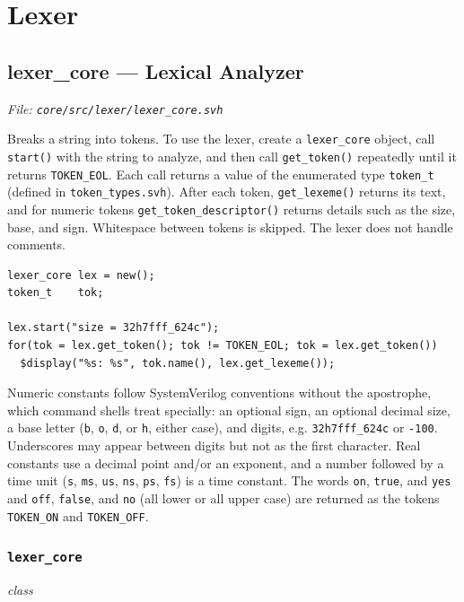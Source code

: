 \documentclass[11pt,letterpaper]{report}
\begin{document}
\chapter{Lexer}
\section{lexer\_core --- Lexical Analyzer}
\noindent\small\textit{File: \texttt{core/src/lexer/lexer\_core.svh}}\par

Breaks a string into tokens. To use the lexer, create a \texttt{lexer\_core} object, call \texttt{start()} with the string to analyze, and then call \texttt{get\_token()} repeatedly until it returns \texttt{TOKEN\_EOL}. Each call returns a value of the enumerated type \texttt{token\_t} (defined in \texttt{token\_types.svh}). After each token, \texttt{get\_lexeme()} returns its text, and for numeric tokens \texttt{get\_token\_descriptor()} returns details such as the size, base, and sign. Whitespace between tokens is skipped. The lexer does not handle comments.

\begin{verbatim}
lexer_core lex = new();
token_t    tok;

lex.start("size = 32h7fff_624c");
for(tok = lex.get_token(); tok != TOKEN_EOL; tok = lex.get_token())
  $display("%s: %s", tok.name(), lex.get_lexeme());
\end{verbatim}

Numeric constants follow SystemVerilog conventions without the apostrophe, which command shells treat specially: an optional sign, an optional decimal size, a base letter (\texttt{b}, \texttt{o}, \texttt{d}, or \texttt{h}, either case), and digits, e.g. \texttt{32h7fff\_624c} or \texttt{-100}. Underscores may appear between digits but not as the first character. Real constants use a decimal point and/or an exponent, and a number followed by a time unit (\texttt{s}, \texttt{ms}, \texttt{us}, \texttt{ns}, \texttt{ps}, \texttt{fs}) is a time constant. The words \texttt{on}, \texttt{true}, and \texttt{yes} and \texttt{off}, \texttt{false}, and \texttt{no} (all lower or all upper case) are returned as the tokens \texttt{TOKEN\_ON} and \texttt{TOKEN\_OFF}.

\subsection*{\texttt{lexer\_core}}
\noindent\small\textit{class}\par
\end{document}
